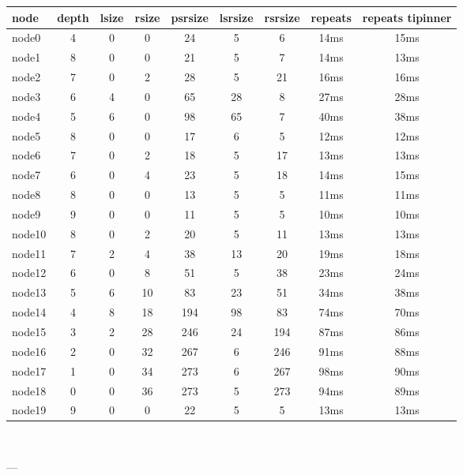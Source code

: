 

\begin{tabular}{|l|c|c|c|c|c|c|c|c|}
\hline node & depth & lsize & rsize & psrsize & lsrsize & rsrsize   & repeats & repeats tipinner\\
    \hline node0 & 4 & 0 & 0 & 24 & 5 & 6 & 14ms & 15ms\\
    \hline node1 & 8 & 0 & 0 & 21 & 5 & 7 & 14ms & 13ms\\
    \hline node2 & 7 & 0 & 2 & 28 & 5 & 21 & 16ms & 16ms\\
    \hline node3 & 6 & 4 & 0 & 65 & 28 & 8 & 27ms & 28ms\\
    \hline node4 & 5 & 6 & 0 & 98 & 65 & 7 & 40ms & 38ms\\
    \hline node5 & 8 & 0 & 0 & 17 & 6 & 5 & 12ms & 12ms\\
    \hline node6 & 7 & 0 & 2 & 18 & 5 & 17 & 13ms & 13ms\\
    \hline node7 & 6 & 0 & 4 & 23 & 5 & 18 & 14ms & 15ms\\
    \hline node8 & 8 & 0 & 0 & 13 & 5 & 5 & 11ms & 11ms\\
    \hline node9 & 9 & 0 & 0 & 11 & 5 & 5 & 10ms & 10ms\\
    \hline node10 & 8 & 0 & 2 & 20 & 5 & 11 & 13ms & 13ms\\
    \hline node11 & 7 & 2 & 4 & 38 & 13 & 20 & 19ms & 18ms\\
    \hline node12 & 6 & 0 & 8 & 51 & 5 & 38 & 23ms & 24ms\\
    \hline node13 & 5 & 6 & 10 & 83 & 23 & 51 & 34ms & 38ms\\
    \hline node14 & 4 & 8 & 18 & 194 & 98 & 83 & 74ms & 70ms\\
    \hline node15 & 3 & 2 & 28 & 246 & 24 & 194 & 87ms & 86ms\\
    \hline node16 & 2 & 0 & 32 & 267 & 6 & 246 & 91ms & 88ms\\
    \hline node17 & 1 & 0 & 34 & 273 & 6 & 267 & 98ms & 90ms\\
    \hline node18 & 0 & 0 & 36 & 273 & 5 & 273 & 94ms & 89ms\\
    \hline node19 & 9 & 0 & 0 & 22 & 5 & 5 & 13ms & 13ms\\

\hline
\end{tabular} \

---


